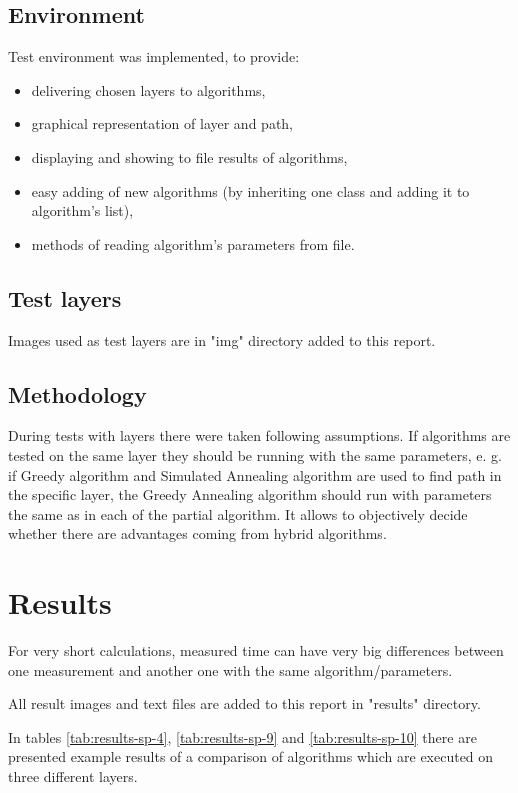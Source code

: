 \documentclass[titlepage]{article}
\begin{document}
\subsection{Environment}
Test environment was implemented, to provide:
\begin{itemize}
\item delivering chosen layers to algorithms,
\item graphical representation of layer and path,
\item displaying and showing to file results of algorithms,
\item easy adding of new algorithms (by inheriting one class and adding it to algorithm's list),
\item methods of reading algorithm's parameters from file.
\end{itemize}

\subsection{Test layers}
Images used as test layers are in "img" directory added to this report.

\subsection{Methodology}

During tests with layers there were taken following assumptions. If algorithms are tested on the same layer they should be running with the same parameters, e. g. if Greedy algorithm and Simulated Annealing algorithm are used to find path in the specific layer, the Greedy Annealing algorithm should run with parameters the same as in each of the partial algorithm. It allows to objectively decide whether there are advantages coming from hybrid algorithms.

\section{Results}
For very short calculations, measured time can have very big differences between one measurement and another one with the same algorithm/parameters.

All result images and text files are added to this report in "results" directory.

In tables \ref{tab:results-sp-4}, \ref{tab:results-sp-9} and \ref{tab:results-sp-10} there are presented example results of a comparison of algorithms which are executed on three different layers.
\end{document}
